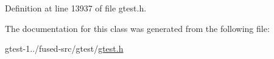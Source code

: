 \-Definition at line 13937 of file gtest.\-h.



\-The documentation for this class was generated from the following file\-:\begin{DoxyCompactItemize}
\item 
gtest-\/1../fused-\/src/gtest/\hyperlink{fused-src_2gtest_2gtest_8h}{gtest.\-h}\end{DoxyCompactItemize}
